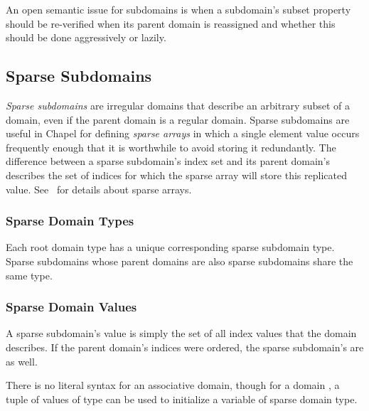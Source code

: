 \begin{openissue}

An open semantic issue for subdomains is when a subdomain's subset
property should be re-verified when its parent domain is reassigned
and whether this should be done aggressively or lazily.

\end{openissue}


\subsection{Sparse Subdomains}
\label{Sparse_Subdomains}

 \emph{Sparse subdomains} are irregular domains that describe an
arbitrary subset of a domain, even if the parent domain is a regular
domain.  Sparse subdomains are useful in Chapel for
defining \emph{sparse arrays} in which a single element value occurs
frequently enough that it is worthwhile to avoid storing it
redundantly.  The difference between a sparse subdomain's index set
and its parent domain's describes the set of indices for which the
sparse array will store this replicated value.
See~ for details about sparse arrays.

\subsubsection{Sparse Domain Types}

Each root domain type has a unique corresponding sparse subdomain
type.  Sparse subdomains whose parent domains are also sparse
subdomains share the same type.

\subsubsection{Sparse Domain Values}
\label{Sparse_Domain_Values}

A sparse subdomain's value is simply the set of all index values that
the domain describes.  If the parent domain's indices were ordered,
the sparse subdomain's are as well.

There is no literal syntax for an associative domain, though for a
domain , a tuple of values of type  can be used
to initialize a variable of sparse domain type.

